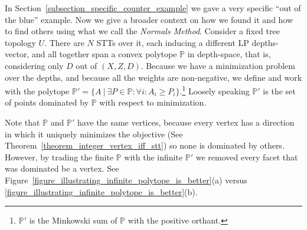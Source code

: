 In Section~\ref{subsection_specific_counter_example} we gave a very specific ``out of the blue'' example. Now we give a broader context on how we found it and how to find others using what we call the \emph{Normals Method}. Consider a fixed tree topology $U$. There are $N$ STTs over it, each inducing a different LP depths-vector, and all together span a convex polytope $\mathbb{P}$ in depth-space, that is, considering only $D$ out of $(X,Z,D)$. Because we have a minimization problem over the depths, and because all the weights are non-negative, we define and work with the polytope $\mathbb{P}' = \{A\ |\ \exists P \in \mathbb{P}: \forall i: A_i \ge P_i\}$.\footnote{$\mathbb{P}'$ is the Minkowski sum of $\mathbb{P}$ with the positive orthant.} Loosely speaking $\mathbb{P}'$ is the set of points dominated by $\mathbb{P}$ with respect to minimization.

Note that $\mathbb{P}$ and $\mathbb{P}'$ have the same vertices, because every vertex has a direction in which it uniquely minimizes the objective (See Theorem~\ref{theorem_integer_vertex_iff_stt}) so none is dominated by others. However, by trading the finite $\mathbb{P}$ with the infinite $\mathbb{P}'$ we removed every facet that was dominated be a vertex. See Figure~\ref{figure_illustrating_infinite_polytope_is_better}(a) versus \ref{figure_illustrating_infinite_polytope_is_better}(b).



